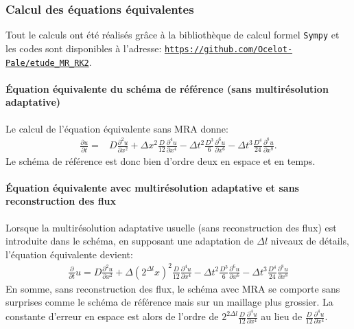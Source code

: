 \subsubsection{Calcul des équations équivalentes}
Tout le calculs ont été réalisés grâce à la bibliothèque de calcul formel \texttt{Sympy} et les codes 
sont disponibles à l'adresse: \href{https://github.com/Ocelot-Pale/etude_MR_RK2}{\nolinkurl{https://github.com/Ocelot-Pale/etude_MR_RK2}}.
\paragraph{Équation équivalente du schéma de référence (sans multirésolution adaptative)}
    Le calcul de l'équation équivalente sans MRA donne:
    \begin{align}
        \frac{\partial u}{\partial t}  =&D \frac{\partial^{2}u}{\partial x^{2}}
        + \Delta x^{2} \frac{D}{12}             \frac{\partial^{4}u}{\partial x^{4}} 
        -  \Delta t^{2} \frac{D^{3}}{6}          \frac{\partial^{6}u}{\partial x^{6}} 
        -  \Delta t^{3} \frac{D^{4}}{24}        \frac{\partial^{8}u}{\partial x^{8}}.
    \end{align}
    Le schéma de référence est donc bien d'ordre deux en espace et en temps.
\paragraph{Équation équivalente avec multirésolution adaptative et sans reconstruction des flux}
    Lorsque la multirésolution adaptative usuelle (sans reconstruction des flux) est introduite dans le schéma, en supposant une adaptation de $\Delta l$ niveaux de détails, 
    l'équation équivalente devient: 
    \begin{align}
        \frac{\partial}{\partial t} u=
            D \frac{\partial^{2}u}{\partial x^{2}}
            +\Delta (2^{\Delta l}x)^{2}  \frac{D}{12} \frac{\partial^{4}u}{\partial x^{4}}
            -\Delta t^{2} \frac{D^{3}}{6}   \frac{\partial^{6}u}{\partial x^{6}}
            -\Delta t^{3} \frac{D^{4} }{24} \frac{\partial^{8}u}{\partial x^{8}}
    \end{align}
    En somme, sans reconstruction des flux, le schéma avec MRA se comporte sans surprises comme le schéma de référence mais sur un maillage plus grossier. 
    La constante d'erreur en espace est alors de l'ordre de $2^{2\Delta l} \frac{D}{12} \frac{\partial^{4}u}{\partial x^{4}}$ 
    au lieu de $\frac{D}{12}\frac{\partial^{4}u}{\partial x^{4}}$.

